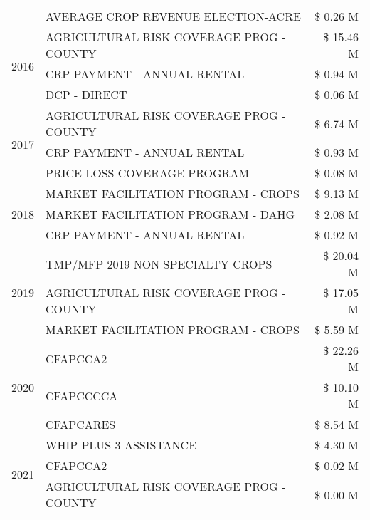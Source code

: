\begin{tabular}{llr}
 & AVERAGE CROP REVENUE ELECTION-ACRE & \$ 0.26 M \\
\cline{1-3}
\multirow[t]{3}{*}{2016} & AGRICULTURAL RISK COVERAGE PROG - COUNTY & \$ 15.46 M \\
 & CRP PAYMENT - ANNUAL RENTAL & \$ 0.94 M \\
 & DCP - DIRECT & \$ 0.06 M \\
\cline{1-3}
\multirow[t]{3}{*}{2017} & AGRICULTURAL RISK COVERAGE PROG - COUNTY & \$ 6.74 M \\
 & CRP PAYMENT - ANNUAL RENTAL & \$ 0.93 M \\
 & PRICE LOSS COVERAGE PROGRAM & \$ 0.08 M \\
\cline{1-3}
\multirow[t]{3}{*}{2018} & MARKET FACILITATION PROGRAM - CROPS & \$ 9.13 M \\
 & MARKET FACILITATION PROGRAM - DAHG & \$ 2.08 M \\
 & CRP PAYMENT - ANNUAL RENTAL & \$ 0.92 M \\
\cline{1-3}
\multirow[t]{3}{*}{2019} & TMP/MFP 2019 NON SPECIALTY CROPS & \$ 20.04 M \\
 & AGRICULTURAL RISK COVERAGE PROG - COUNTY & \$ 17.05 M \\
 & MARKET FACILITATION PROGRAM - CROPS & \$ 5.59 M \\
\cline{1-3}
\multirow[t]{3}{*}{2020} & CFAPCCA2 & \$ 22.26 M \\
 & CFAPCCCCA & \$ 10.10 M \\
 & CFAPCARES & \$ 8.54 M \\
\cline{1-3}
\multirow[t]{3}{*}{2021} & WHIP PLUS 3 ASSISTANCE & \$ 4.30 M \\
 & CFAPCCA2 & \$ 0.02 M \\
 & AGRICULTURAL RISK COVERAGE PROG - COUNTY & \$ 0.00 M \\
\cline{1-3}
\bottomrule
\end{tabular}
